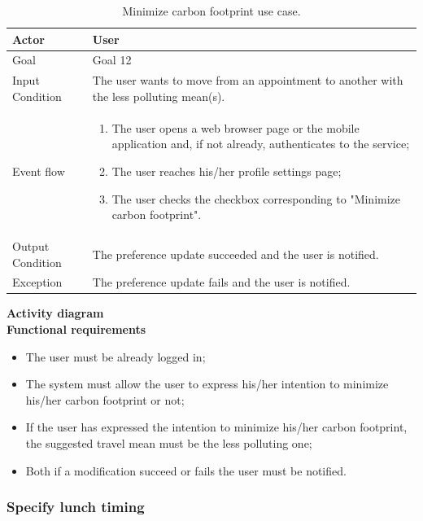 \documentclass{article}
\begin{document}
	\begin{table}[htp]
	\caption{Minimize carbon footprint use case.}
		\begin{center}
    			\begin{tabular}{p{}|p{}}
   			 	\hline
    				Actor & User \\ \hline
    				Goal & Goal 12 \\ \hline
    				Input Condition & The user wants to move from an appointment to another with the less polluting mean(s). \\ \hline
    				Event flow & 
				\begin{enumerate}
  					\item The user opens a web browser page or the mobile application and, if not already, authenticates to the service;
					\item The user reaches his/her profile settings page;
					\item The user checks the checkbox corresponding to "Minimize carbon footprint".
 				 \end{enumerate} \\ \hline
    				Output Condition & The preference update succeeded and the user is notified. \\ \hline
    				Exception & The preference update fails and the user is notified. \\ \hline
    			\end{tabular}
		\end{center}
	\end{table}
	
	\bigskip
	\noindent
	\textbf{Activity diagram} \\
	
	
	\bigskip
	\noindent
	\textbf{Functional requirements} \\
	\begin{itemize}
		\item The user must be already logged in;
		\item The system must allow the user to express his/her intention to minimize his/her carbon footprint or not;
		\item If the user has expressed the intention to minimize his/her carbon footprint, the suggested travel mean must be the less polluting one;
		\item Both if a modification succeed or fails the user must be notified.
	\end{itemize}


	\subsubsection{Specify lunch timing}
	
\end{document}
